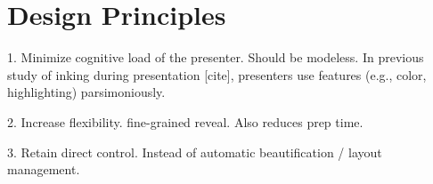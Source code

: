\section{Design Principles}

1. Minimize cognitive load of the presenter. Should be modeless.
In previous study of inking during presentation [cite], presenters use
features (e.g., color, highlighting) parsimoniously.

2. Increase flexibility. fine-grained reveal. Also reduces prep time.

3. Retain direct control. Instead of automatic beautification / layout management. 


